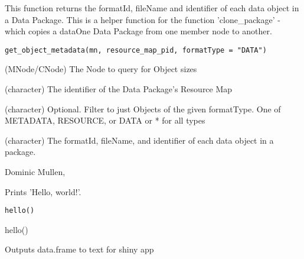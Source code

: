 \documentclass[letterpaper]{book}
\begin{document}
%
\begin{Description}\relax
This function returns the formatId, fileName and identifier of each data
object in a Data Package.  This is a helper function for the function
'clone\_package' - which copies a dataOne Data Package from one member node to
another.
\end{Description}
%
\begin{Usage}
\begin{verbatim}
get_object_metadata(mn, resource_map_pid, formatType = "DATA")
\end{verbatim}
\end{Usage}
%
\begin{Arguments}
\begin{ldescription}
\item[\code{mn}] (MNode/CNode) The Node to query for Object sizes

\item[\code{resource\_map\_pid}] (character) The identifier of the Data Package's Resource Map

\item[\code{formatType}] (character) Optional. Filter to just Objects of the given
formatType. One of METADATA, RESOURCE, or DATA or * for all types
\end{ldescription}
\end{Arguments}
%
\begin{Value}
(character) The formatId, fileName, and identifier of each data object in a package.
\end{Value}
%
\begin{Author}\relax
Dominic Mullen, 
\end{Author}
%
\begin{Description}\relax
Prints 'Hello, world!'.
\end{Description}
%
\begin{Usage}
\begin{verbatim}
hello()
\end{verbatim}
\end{Usage}
%
\begin{Examples}
\begin{ExampleCode}
hello()
\end{ExampleCode}
\end{Examples}
%
\begin{Description}\relax
Outputs data.frame to text for shiny app
\end{Description}
\end{document}

